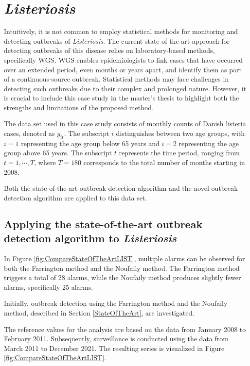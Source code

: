 \documentclass[a4paper,twoside,11pt]{report} %
\theoremstyle{definition}
\theoremstyle{definition}
\theoremstyle{definition}
\theoremstyle{definition}
\theoremstyle{remark}
\begin{document}
\section{\textit{Listeriosis}}

Intuitively, it is not common to employ statistical methods for monitoring and detecting outbreaks of \textit{Listeriosis}. The current state-of-the-art approach for detecting outbreaks of this disease relies on laboratory-based methods, specifically WGS. WGS enables epidemiologists to link cases that have occurred over an extended period, even months or years apart, and identify them as part of a continuous-source outbreak. Statistical methods may face challenges in detecting such outbreaks due to their complex and prolonged nature. However, it is crucial to include this case study in the master's thesis to highlight both the strengths and limitations of the proposed method.

The data set used in this case study consists of monthly counts of Danish listeria cases, denoted as \(y_{it}\). The subscript \(i\) distinguishes between two age groups, with \(i=1\) representing the age group below 65 years and \(i=2\) representing the age group above 65 years. The subscript \(t\) represents the time period, ranging from \(t=1,\cdots,T\), where \(T=180\) corresponds to the total number of months starting in 2008.

Both the state-of-the-art outbreak detection algorithm and the novel outbreak detection algorithm are applied to this data set.

\subsection{Applying the state-of-the-art outbreak detection algorithm to \textit{Listeriosis}}

In Figure \ref{fig:CompareStateOfTheArtLIST}, multiple alarms can be observed for both the Farrington method and the Noufaily method. The Farrington method triggers a total of 28 alarms, while the Noufaily method produces slightly fewer alarms, specifically 25 alarms.

Initially, outbreak detection using the Farrington method and the Noufaily method, described in Section \ref{StateOfTheArt}, are investigated.

The reference values for the analysis are based on the data from January 2008 to February 2011. Subsequently, surveillance is conducted using the data from March 2011 to December 2021. The resulting series is visualized in Figure \ref{fig:CompareStateOfTheArtLIST}.
\end{document}
